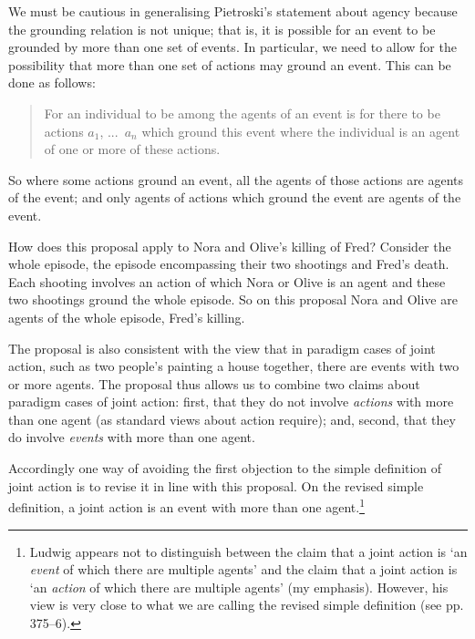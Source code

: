 \documentclass[12pt,a4paper]{extarticle}
\begin{document}
We must be cautious in generalising Pietroski's statement about agency because the grounding relation is not unique; 
that is, it is possible for an event to be grounded by more than one set of events.
In particular, we need to allow for the possibility that more than one set of actions may ground an event.
This can be done as follows:
%
\begin{quote}
For an individual to be among the agents of an event is for there to be actions $a_1$, ...\ $a_n$ which ground this event where the individual is an agent of one or more of these actions.
\end{quote}
%
So where some actions ground an event, all the agents of those actions are agents of the event; and only agents of actions which ground the event are agents of the event.

How does this proposal apply to Nora and Olive's killing of Fred?
Consider the whole episode, the episode encompassing their two shootings and Fred's death.
Each shooting involves an action of which Nora or Olive is an agent
and these two shootings ground the whole episode.
So on this proposal Nora and Olive are agents of the whole episode, Fred's killing. 

The proposal is also consistent with the view that in paradigm cases of joint action, such as two people's painting a house together, there are events with two or more agents.
The proposal thus allows us to combine two claims about paradigm cases of joint action: first, that they do not involve \emph{actions} with more than one agent (as standard views about action require); and, second, that they do involve \emph{events} with more than one agent.

Accordingly one way of avoiding the first objection to the simple definition of joint action is to revise it in line with this proposal.  
On the revised simple definition, a joint action is an event with more than one agent.\footnote{
Ludwig appears not to distinguish between the claim that 
a joint action is `an \emph{event} of which there are multiple agents' \citep[p.\ 366]{ludwig_collective_2007}
and the claim that
a joint action is `an \emph{action} of which there are multiple agents'
\citep[p.\ 367]{ludwig_collective_2007}
(my emphasis).
However, his view is very close to what we are calling the revised simple definition (see pp. 375--6).
}
\end{document}
